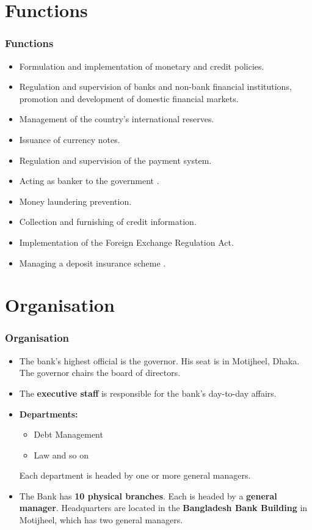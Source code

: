 \documentclass[usenames,dvipsnames]{beamer}
\begin{document}
\section{Functions}
\begin{frame}
\frametitle{Functions}
\begin{itemize}
\item Formulation and implementation of monetary and credit policies.
\item Regulation and supervision of banks and non-bank financial institutions, promotion and development of domestic financial markets.
\item Management of the country's international reserves.
\item Issuance of currency notes.
\item Regulation and supervision of the payment system.
\item Acting as banker to the government .
\item Money laundering prevention.
\item Collection and furnishing of credit information.
\item Implementation of the Foreign Exchange Regulation Act.
\item Managing a deposit insurance scheme .
\end{itemize}
\end{frame}

\section{Organisation}
\begin{frame}
\frametitle{Organisation}
\begin{itemize}
\item The bank's highest official is the governor. His seat is in Motijheel, Dhaka. The governor chairs the board of directors.
\item The \textbf{executive staff} is responsible for the bank's day-to-day affairs.
\item \textbf{Departments:} \begin{itemize}
                             \item Debt Management
                             \item Law and so on
                            \end{itemize}
Each department is headed by one or more general managers.
\item The Bank has \textbf{10 physical branches}. Each is headed by a \textbf{general manager}. Headquarters are located in the \textbf{Bangladesh Bank Building} in Motijheel, which has two general managers. 
\end{itemize}
\end{frame}
\end{document}
